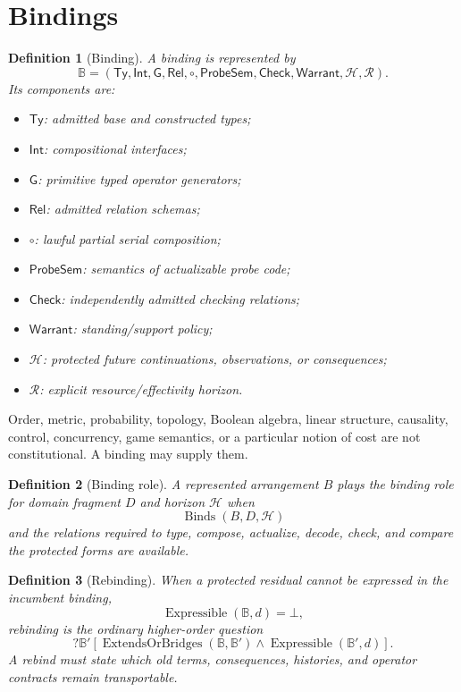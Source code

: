 \documentclass[11pt,oneside]{article}
\newtheorem{definition}{Definition}[section]
\newcommand{\B}{\mathbb B}
\begin{document}
\section{Bindings}

\begin{definition}[Binding]
A binding is represented by
\[
\boxed{
\B=
(\mathsf{Ty},\mathsf{Int},\mathsf G,\mathsf{Rel},\circ,
\mathsf{ProbeSem},\mathsf{Check},\mathsf{Warrant},
\mathcal H,\mathcal R).
}
\]
Its components are:
\begin{itemize}
\item \(\mathsf{Ty}\): admitted base and constructed types;
\item \(\mathsf{Int}\): compositional interfaces;
\item \(\mathsf G\): primitive typed operator generators;
\item \(\mathsf{Rel}\): admitted relation schemas;
\item \(\circ\): lawful partial serial composition;
\item \(\mathsf{ProbeSem}\): semantics of actualizable probe code;
\item \(\mathsf{Check}\): independently admitted checking relations;
\item \(\mathsf{Warrant}\): standing/support policy;
\item \(\mathcal H\): protected future continuations, observations, or consequences;
\item \(\mathcal R\): explicit resource/effectivity horizon.
\end{itemize}
\end{definition}

Order, metric, probability, topology, Boolean algebra, linear structure, causality, control, concurrency, game semantics, or a particular notion of cost are not constitutional.  A binding may supply them.

\begin{definition}[Binding role]
A represented arrangement \(B\) plays the binding role for domain fragment \(D\) and horizon \(\mathcal H\) when
\[
\operatorname{Binds}(B,D,\mathcal H)
\]
and the relations required to type, compose, actualize, decode, check, and compare the protected forms are available.
\end{definition}

\begin{definition}[Rebinding]
When a protected residual cannot be expressed in the incumbent binding,
\[
\operatorname{Expressible}(\B,d)=\bot,
\]
rebinding is the ordinary higher-order question
\[
?\B'[
\operatorname{ExtendsOrBridges}(\B,\B')
\land
\operatorname{Expressible}(\B',d)
].
\]
A rebind must state which old terms, consequences, histories, and operator contracts remain transportable.
\end{definition}
\end{document}
